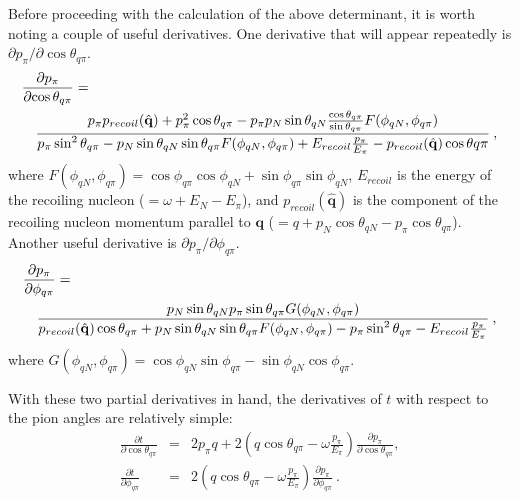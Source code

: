 Before proceeding with the calculation of the above determinant, it is worth 
noting a couple of useful derivatives.  One derivative that will appear 
repeatedly is $\partial{p_{\pi}}/\partial{\cos{\theta_{q\pi}}}$.
\begin{eqnarray}
\lefteqn{
\frac{\partial{p_{\pi}}}{\partial{\cos{\theta_{q\pi}}}} = }  \\ 
& & \frac{
p_{\pi} p_{recoil}(\hat{\mathbf{q}})+p_{\pi}^2\cos{\theta_{q\pi}} - 
p_{\pi}p_N\sin{\theta_{qN}}\frac{\cos{\theta_{q\pi}}}{\sin{\theta_{q\pi}}}
F(\phi_{qN},\phi_{q\pi}) 
}
{
p_{\pi}\sin^2{\theta_{q\pi}}-p_N\sin{\theta_{qN}}\sin{\theta_{q\pi}}
F(\phi_{qN},\phi_{q\pi}) + E_{recoil}\frac{p_{\pi}}{E_{\pi}} - 
p_{recoil}(\hat{\mathbf{q}})\cos{\theta{q\pi}}
} \nonumber \:,
\end{eqnarray}
where $F(\phi_{qN},\phi_{q\pi}) =  
\cos{\phi_{q\pi}}\cos{\phi_{qN}}+\sin{\phi_{q\pi}}\sin{\phi_{qN}}$, 
$E_{recoil}$ is the energy of the recoiling nucleon ($=\omega+E_N - E_\pi$), 
and $p_{recoil}(\hat{\mathbf{q}})$ is the component of the recoiling nucleon 
momentum parallel to $\mathbf{q}$ ($= q+p_N\cos{\theta_{qN}}-p_{\pi}
\cos{\theta_{q\pi}}$).  Another useful derivative is 
$\partial{p_{\pi}}/\partial{\phi_{q\pi}}$.
\begin{eqnarray}
\lefteqn{ \frac{\partial{p_{\pi}}}{\partial{\phi_{q\pi}}} = }  \\ 
& &\frac{
p_N\sin{\theta_{qN}}p_{\pi}\sin{\theta_{q\pi}}G(\phi_{qN},\phi_{q\pi})
}
{
p_{recoil}(\hat{\mathbf{q}})\cos{\theta_{q\pi}} + 
p_N\sin{\theta_{qN}}\sin{\theta_{q\pi}}F(\phi_{qN},\phi_{q\pi}) -
p_{\pi}\sin^2{\theta_{q\pi}}-E_{recoil}\frac{p_{\pi}}{E_{\pi}}
} \nonumber \:,
\end{eqnarray}
where $G(\phi_{qN},\phi_{q\pi}) = \cos{\phi_{qN}}\sin{\phi_{q\pi}}
-\sin{\phi_{qN}}\cos{\phi_{q\pi}}$.

With these two partial derivatives in hand, the derivatives of $t$ with 
respect to the pion angles are relatively simple:
\begin{eqnarray}
\frac{\partial{t}}{\partial{\cos{\theta_{q\pi}}}} & = & 
2p_{\pi}q + 2(q\cos{\theta_{q\pi}}-\omega\frac{p_{\pi}}{E_{\pi}})
\frac{\partial{p_{\pi}}}{\partial{\cos{\theta_{q\pi}}}}, \\
%
\frac{\partial{t}}{\partial{\phi_{q\pi}}} & = & 
2(q\cos{\theta_{q\pi}}-\omega\frac{p_{\pi}}{E_{\pi}})
\frac{\partial{p_{\pi}}}{\partial{\phi_{q\pi}}} \:.
\end{eqnarray}

